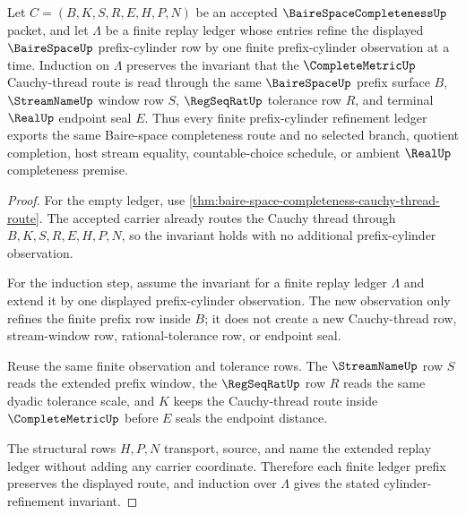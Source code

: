 \begin{theorem}
\label{thm:baire-space-cylinder-induction}
Let $C=(B,K,S,R,E,H,P,N)$ be an accepted $\BaireSpaceCompletenessUp$ packet, and let $\Lambda$ be a finite replay ledger whose entries refine the displayed $\BaireSpaceUp$ prefix-cylinder row by one finite prefix-cylinder observation at a time. Induction on $\Lambda$ preserves the invariant that the $\CompleteMetricUp$ Cauchy-thread route is read through the same $\BaireSpaceUp$ prefix surface $B$, $\StreamNameUp$ window row $S$, $\RegSeqRatUp$ tolerance row $R$, and terminal $\RealUp$ endpoint seal $E$. Thus every finite prefix-cylinder refinement ledger exports the same Baire-space completeness route and no selected branch, quotient completion, host stream equality, countable-choice schedule, or ambient $\RealUp$ completeness premise.
\end{theorem}
\begin{proof}
For the empty ledger, use \autoref{thm:baire-space-completeness-cauchy-thread-route}. The accepted carrier already routes the Cauchy thread through $B,K,S,R,E,H,P,N$, so the invariant holds with no additional prefix-cylinder observation.

For the induction step, assume the invariant for a finite replay ledger $\Lambda$ and extend it by one displayed prefix-cylinder observation. The new observation only refines the finite prefix row inside $B$; it does not create a new Cauchy-thread row, stream-window row, rational-tolerance row, or endpoint seal.

Reuse the same finite observation and tolerance rows. The $\StreamNameUp$ row $S$ reads the extended prefix window, the $\RegSeqRatUp$ row $R$ reads the same dyadic tolerance scale, and $K$ keeps the Cauchy-thread route inside $\CompleteMetricUp$ before $E$ seals the endpoint distance.

The structural rows $H,P,N$ transport, source, and name the extended replay ledger without adding any carrier coordinate. Therefore each finite ledger prefix preserves the displayed route, and induction over $\Lambda$ gives the stated cylinder-refinement invariant.
\end{proof}

